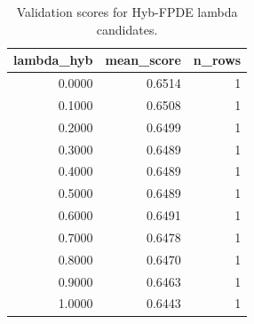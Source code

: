 \begin{table}[t]
\caption{Validation scores for Hyb-FPDE lambda candidates.}
\label{tab:lambda_distribution_computed}
\centering
\begin{tabular}{rrr}
\toprule
lambda\_hyb & mean\_score & n\_rows \\
\midrule
0.0000 & 0.6514 & 1 \\
0.1000 & 0.6508 & 1 \\
0.2000 & 0.6499 & 1 \\
0.3000 & 0.6489 & 1 \\
0.4000 & 0.6489 & 1 \\
0.5000 & 0.6489 & 1 \\
0.6000 & 0.6491 & 1 \\
0.7000 & 0.6478 & 1 \\
0.8000 & 0.6470 & 1 \\
0.9000 & 0.6463 & 1 \\
1.0000 & 0.6443 & 1 \\
\bottomrule
\end{tabular}

\end{table}
